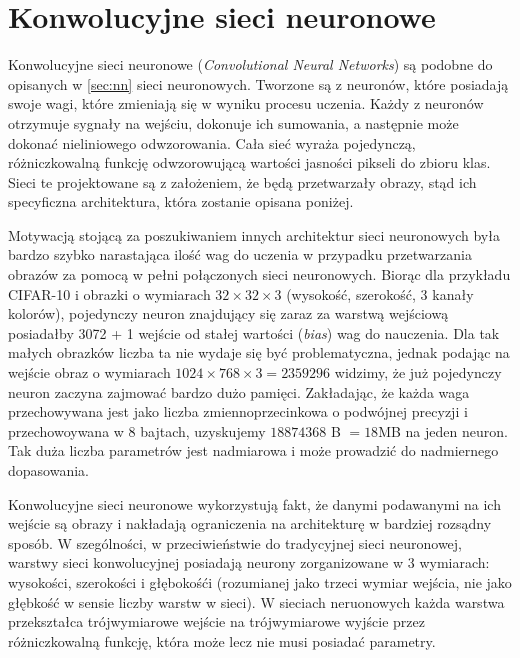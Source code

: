 \section{Konwolucyjne sieci neuronowe}\label{sec:cnn}

Konwolucyjne sieci neuronowe (\textit{Convolutional Neural Networks}) są podobne do opisanych w \ref{sec:nn} sieci neuronowych.
Tworzone są z neuronów, które posiadają swoje wagi, które zmieniają się w wyniku procesu uczenia.
Każdy z neuronów otrzymuje sygnały na wejściu, dokonuje ich sumowania, a następnie może dokonać nieliniowego odwzorowania.
Cała sieć wyraża pojedynczą, różniczkowalną funkcję odwzorowującą wartości jasności pikseli do zbioru klas.
Sieci te projektowane są z założeniem, że będą przetwarzały obrazy, stąd ich specyficzna architektura, która zostanie opisana poniżej.

Motywacją stojącą za poszukiwaniem innych architektur sieci neuronowych była bardzo szybko narastająca ilość wag do uczenia w przypadku przetwarzania obrazów za pomocą w pełni połączonych sieci neuronowych.
Biorąc dla przykładu CIFAR-10 i obrazki o wymiarach $ 32 \times 32 \times 3$ (wysokość, szerokość, 3 kanały kolorów), pojedynczy neuron znajdujący się zaraz za warstwą wejściową posiadałby 3072 + 1 wejście od stałej wartości (\textit{bias}) wag do nauczenia.
Dla tak małych obrazków liczba ta nie wydaje się być problematyczna, jednak podając na wejście obraz o wymiarach $1024 \times 768 \times 3 = 2359296$ widzimy, że już pojedynczy neuron zaczyna zajmować bardzo dużo pamięci.
Zakładając, że każda waga przechowywana jest jako liczba zmiennoprzecinkowa o podwójnej precyzji i przechowoywana w 8 bajtach, uzyskujemy $18874368$ B $= 18$MB na jeden neuron.
Tak duża liczba parametrów jest nadmiarowa i może prowadzić do nadmiernego dopasowania.

Konwolucyjne sieci neuronowe wykorzystują fakt, że danymi podawanymi na ich wejście są obrazy i nakładają ograniczenia na architekturę w bardziej rozsądny sposób.
W szególności, w przeciwieństwie do tradycyjnej sieci neuronowej, warstwy sieci konwolucyjnej posiadają neurony zorganizowane w 3 wymiarach: wysokości, szerokości i głębokośći (rozumianej jako trzeci wymiar wejścia, nie jako głębkość w sensie liczby warstw w sieci).
W sieciach neruonowych każda warstwa przekształca trójwymiarowe wejście na trójwymiarowe wyjście przez różniczkowalną funkcję, która może lecz nie musi posiadać parametry.

